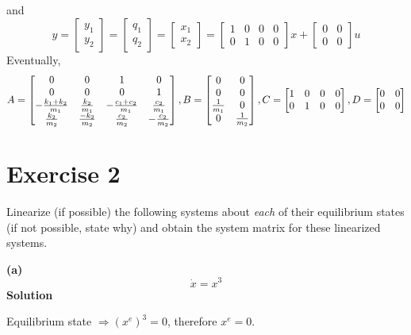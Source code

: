 \documentclass[12pt,a4paper]{article}
\begin{document}
and
\[
y = \begin{bmatrix}
	y_1 \\ y_2 
\end{bmatrix} = \begin{bmatrix}
q_1 \\ q_2
\end{bmatrix} = \begin{bmatrix}
x_1 \\ x_2
\end{bmatrix} = \begin{bmatrix}
1 & 0 & 0 & 0 \\
0 & 1 & 0 & 0
\end{bmatrix}x + \begin{bmatrix}
0 &  0 \\ 0 & 0
\end{bmatrix}u
\]
Eventually,
\[
A =  \begin{bmatrix}
	0 & 0 & 1 & 0 \\
	0 & 0 & 0 & 1 \\
	-{k_1 + k_2 \over m_1} & {k_2\over m_1} & - {c_1 + c_2\over m_1} & {c_2\over m_1} \\
	{k_2\over m_2} & {-k_2\over m_2} & {c_2\over m_2} & -{c_2\over m_2}
\end{bmatrix}, B =  \begin{bmatrix}
0 & 0 \\
0 & 0 \\
{1\over m_1} & 0 \\
0 & {1\over m_2}
\end{bmatrix}, C = \begin{bmatrix}
1 & 0 & 0 & 0 \\
0 & 1 & 0 & 0
\end{bmatrix}, D = \begin{bmatrix}
0 &  0 \\ 0 & 0
\end{bmatrix}
\]
\par\vspace{1.5cm}

\section*{Exercise 2}
Linearize (if possible) the following systems about \emph{each} of their equilibrium states (if not possible, state why) and obtain the system matrix for these linearized systems.

\textbf{(a)}
\[\dot x=x^3\]
\textbf{Solution}

Equilibrium state $\Rightarrow (x^e)^3 = 0$, therefore $x^e = 0$.
\end{document}
